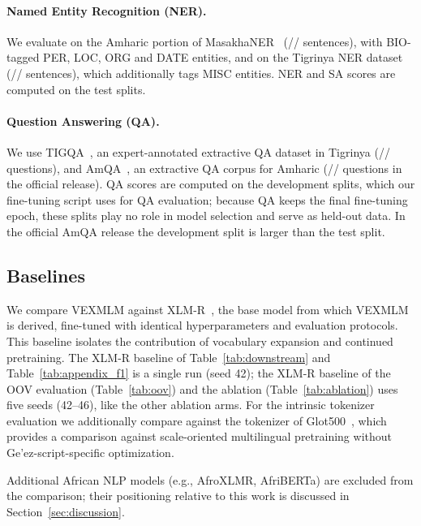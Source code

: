 \paragraph{Named Entity Recognition (NER).} We evaluate on the Amharic portion of MasakhaNER~\cite{adelani2021masakhaner} (\splitNERAmhTrain{}/\splitNERAmhValidation{}/\splitNERAmhTest{} sentences), with BIO-tagged PER, LOC, ORG and DATE entities, and on the Tigrinya NER dataset~\cite{yohannes2022method} (\splitNERTirTrain{}/\splitNERTirValidation{}/\splitNERTirTest{} sentences), which additionally tags MISC entities. NER and SA scores are computed on the test splits.

\paragraph{Question Answering (QA).} We use TIGQA~\cite{teklehaymanot2024tigqa}, an expert-annotated extractive QA dataset in Tigrinya (\splitTigQATrain{}/\splitTigQAValidation{}/\splitTigQATest{} questions), and AmQA~\cite{taffa2024low}, an extractive QA corpus for Amharic (\splitAmQATrain{}/\splitAmQAValidation{}/\splitAmQATest{} questions in the official release). QA scores are computed on the development splits, which our fine-tuning script uses for QA evaluation; because QA keeps the final fine-tuning epoch, these splits play no role in model selection and serve as held-out data. In the official AmQA release the development split is larger than the test split.

\subsection{Baselines}
We compare VEXMLM against XLM-R~\cite{conneau2020unsupervised}, the base model from which VEXMLM is derived, fine-tuned with identical hyperparameters and evaluation protocols. This baseline isolates the contribution of vocabulary expansion and continued pretraining. The XLM-R baseline of Table~\ref{tab:downstream} and Table~\ref{tab:appendix_f1} is a single run (seed 42); the XLM-R baseline of the OOV evaluation (Table~\ref{tab:oov}) and the ablation (Table~\ref{tab:ablation}) uses five seeds (42--46), like the other ablation arms. For the intrinsic tokenizer evaluation we additionally compare against the tokenizer of Glot500~\cite{imanigooghari2023glot500}, which provides a comparison against scale-oriented multilingual pretraining without Ge'ez-script-specific optimization.

Additional African NLP models (e.g., AfroXLMR, AfriBERTa) are excluded from the comparison; their positioning relative to this work is discussed in Section~\ref{sec:discussion}.

